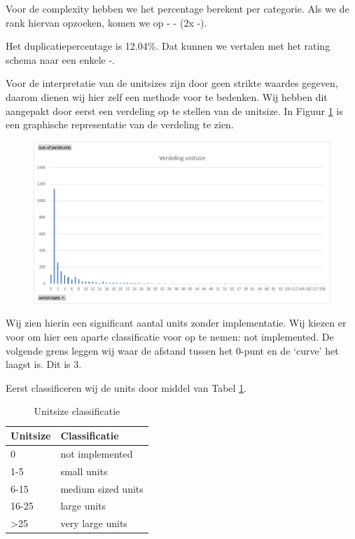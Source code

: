 \documentclass[a4paper]{article}
\begin{document}
Voor de complexity hebben we het percentage berekent per categorie. Als we de rank hiervan opzoeken, komen we op - - (2x -).

Het duplicatiepercentage is 12.04\%. Dat kunnen we vertalen met het rating schema naar een enkele -.

Voor de interpretatie van de unitsizes zijn door \cite{A} geen strikte waardes gegeven, daarom dienen wij hier zelf een methode voor te bedenken.
Wij hebben dit aangepakt door eerst een verdeling op te stellen van de unitsize. In Figuur \ref{fig:VerdelingUnitsize} is een graphische representatie van de verdeling te zien.
\begin{figure}[htbp]
\centering
\includegraphics[width=0.8 \textwidth]{VerdelingUnitsize.png}
\label{fig:VerdelingUnitsize}
\end{figure}

Wij zien hierin een significant aantal units zonder implementatie. Wij kiezen er voor om hier een aparte classificatie voor op te nemen: not implemented.
De volgende grens leggen wij waar de afstand tussen het 0-punt en de `curve' het laagst is. Dit is 3.


Eerst classificeren wij de units door middel van Tabel \ref{tbl:UnitSizeClassificatie}.

\begin{table}[h]
\caption{Unitsize classificatie}
\label{tbl:UnitSizeClassificatie}
\begin{tabular}{|l|l|}
\hline
Unitsize         & Classificatie      \\ \hline
0                & not implemented    \\
1-5              & small units        \\
6-15             & medium sized units \\
16-25            & large units        \\
\textgreater{}25 & very large units   \\ \hline
\end{tabular}
\end{table}
\end{document}
